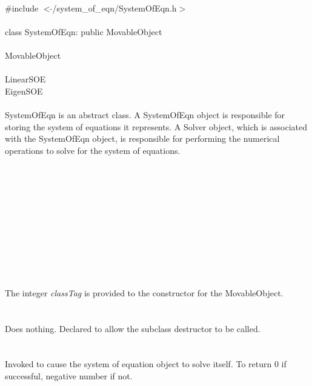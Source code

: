 
   \\
\indent \#include $<\tilde{ }$/system\_of\_eqn/SystemOfEqn.h$>$  \\

  \\
\indent class SystemOfEqn:  public MovableObject \\

 \\
\indent MovableObject \\
\indent{} \\
\indent\indent\indent LinearSOE \\
\indent\indent\indent EigenSOE \\

  \\
\indent SystemOfEqn is an abstract class. A SystemOfEqn object
is responsible for storing the system of equations it represents.
A Solver object, which is associated with the SystemOfEqn object, is
responsible for performing the numerical operations to solve for the
system of equations. \\ 

 \\
\indent{}  \\ 
\indent{}  \\ \\
\indent{}  \\ 
\indent{}\\  \\
\indent{}  \\ 
\indent{} \\


  \\
  \\
The integer {\em classTag} is provided to the constructor for the
MovableObject.  \\

 \\
\\ 
Does nothing. Declared to allow the subclass destructor to be called. \\

  \\
 \\
Invoked to cause the system of equation object to solve itself. To
return $0$ if successful, negative number if not.




